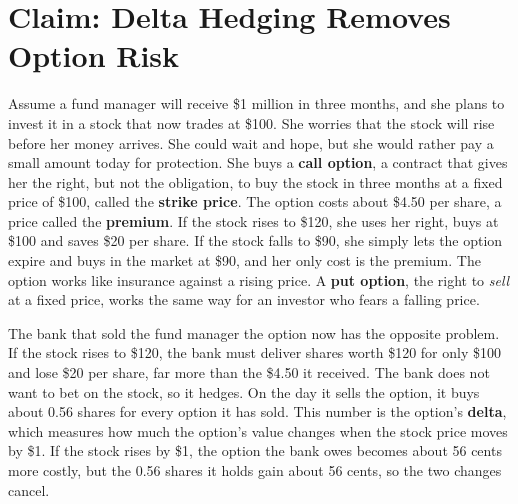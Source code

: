 \makeatletter
{}
\makeatother

\makeatletter
\makeatother

\chapter{Claim: Delta Hedging Removes Option Risk}
\label{ch:14}

Assume a fund manager will receive \$1 million in three months, and she plans to invest it in a stock that now trades at \$100. She worries that the stock will rise before her money arrives. She could wait and hope, but she would rather pay a small amount today for protection. She buys a \textbf{call option}, a contract that gives her the right, but not the obligation, to buy the stock in three months at a fixed price of \$100, called the \textbf{strike price}. The option costs about \$4.50 per share, a price called the \textbf{premium}. If the stock rises to \$120, she uses her right, buys at \$100 and saves \$20 per share. If the stock falls to \$90, she simply lets the option expire and buys in the market at \$90, and her only cost is the premium. The option works like insurance against a rising price. A \textbf{put option}, the right to \emph{sell} at a fixed price, works the same way for an investor who fears a falling price.

The bank that sold the fund manager the option now has the opposite problem. If the stock rises to \$120, the bank must deliver shares worth \$120 for only \$100 and lose \$20 per share, far more than the \$4.50 it received. The bank does not want to bet on the stock, so it hedges. On the day it sells the option, it buys about 0.56 shares for every option it has sold. This number is the option's \textbf{delta}, which measures how much the option's value changes when the stock price moves by \$1. If the stock rises by \$1, the option the bank owes becomes about 56 cents more costly, but the 0.56 shares it holds gain about 56 cents, so the two changes cancel.

